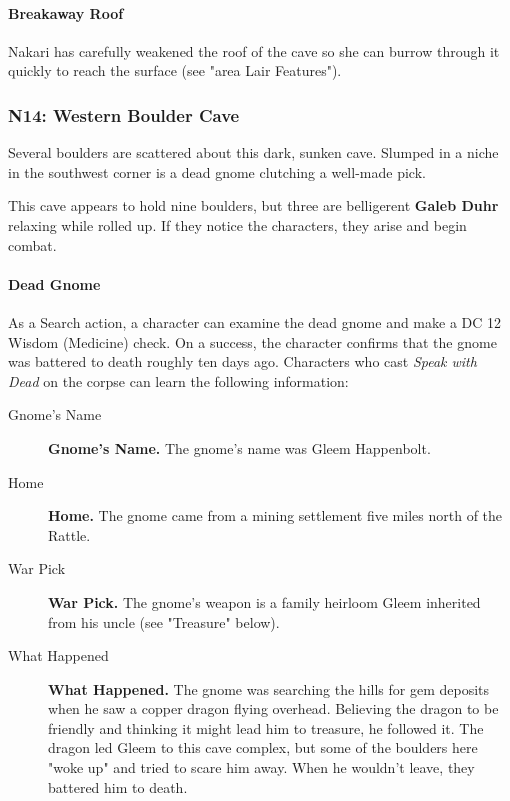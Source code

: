 \documentclass[letterpaper, 11pt, twocolumn]{dndbook}
\begin{document}
\paragraph{Breakaway Roof}

Nakari has carefully weakened the roof of the cave so she can burrow through it quickly to reach the surface (see "area Lair Features").

\subsubsection{N14: Western Boulder Cave}

\begin{DndReadAloud}
Several boulders are scattered about this dark, sunken cave. Slumped in a niche in the southwest corner is a dead gnome clutching a well-made pick.
\end{DndReadAloud}

This cave appears to hold nine boulders, but three are belligerent \textbf{Galeb Duhr} relaxing while rolled up. If they notice the characters, they arise and begin combat.

\paragraph{Dead Gnome}

As a Search action, a character can examine the dead gnome and make a DC 12 Wisdom (Medicine) check. On a success, the character confirms that the gnome was battered to death roughly ten days ago. Characters who cast \textit{Speak with Dead} on the corpse can learn the following information:

\begin{description}
\item[Gnome's Name] \textbf{Gnome's Name.} The gnome's name was Gleem Happenbolt.
\item[Home] \textbf{Home.} The gnome came from a mining settlement five miles north of the Rattle.
\item[War Pick] \textbf{War Pick.} The gnome's weapon is a family heirloom Gleem inherited from his uncle (see "Treasure" below).
\item[What Happened] \textbf{What Happened.} The gnome was searching the hills for gem deposits when he saw a copper dragon flying overhead. Believing the dragon to be friendly and thinking it might lead him to treasure, he followed it. The dragon led Gleem to this cave complex, but some of the boulders here "woke up" and tried to scare him away. When he wouldn't leave, they battered him to death.
\end{description}
\end{document}
